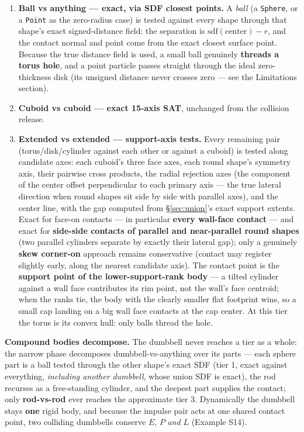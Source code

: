 \documentclass[11pt]{article}
\newcommand{\code}[1]{\texttt{#1}}
\begin{document}
\begin{enumerate}
\item \textbf{Ball vs anything --- exact, via SDF closest points.} A
      \emph{ball} (a \code{Sphere}, or a \code{Point} as the
      zero-radius case) is tested against every shape through that
      shape's exact signed-distance field: the separation is
      $\mathrm{sdf}(\text{center}) - r$, and the contact normal and
      point come from the exact closest surface point. Because the
      true distance field is used, a small ball genuinely
      \textbf{threads a torus hole}, and a point particle passes
      straight through the ideal zero-thickness disk (its unsigned
      distance never crosses zero --- see the Limitations section).
\item \textbf{Cuboid vs cuboid --- exact 15-axis SAT}, unchanged from
      the collision release.
\item \textbf{Extended vs extended --- support-axis tests.} Every
      remaining pair (torus/disk/cylinder against each other or
      against a cuboid) is tested along candidate axes: each cuboid's
      three face axes, each round shape's symmetry axis, their
      pairwise cross products, the radial rejection axes (the
      component of the center offset perpendicular to each primary
      axis --- the true lateral direction when round shapes sit side
      by side with parallel axes), and the center line, with the gap
      computed from \S\ref{sec:union}'s exact support extents. Exact
      for face-on contacts --- in particular \textbf{every wall-face
      contact} --- and exact for \textbf{side-side contacts of
      parallel and near-parallel round shapes} (two parallel cylinders
      separate by exactly their lateral gap); only a genuinely
      \textbf{skew corner-on} approach remains conservative (contact
      may register slightly early, along the nearest candidate axis).
      The contact point is the \textbf{support point of the
      lower-support-rank body} --- a tilted cylinder against a wall
      face contributes its rim point, not the wall's face centroid;
      when the ranks tie, the body with the clearly smaller flat
      footprint wins, so a small cap landing on a big wall face
      contacts at the cap center. At this tier the torus is its convex
      hull: only balls thread the hole.
\end{enumerate}

\textbf{Compound bodies decompose.} The dumbbell never reaches a tier
as a whole: the narrow phase decomposes dumbbell-vs-anything over its
parts --- each sphere part is a ball tested through the other shape's
exact SDF (tier 1, exact against everything, \emph{including another
dumbbell}, whose union SDF is exact), the rod recurses as a
free-standing cylinder, and the deepest part supplies the contact; only
\textbf{rod-vs-rod} ever reaches the approximate tier 3. Dynamically
the dumbbell stays \textbf{one} rigid body, and because the impulse
pair acts at one shared contact point, two colliding dumbbells conserve
$E$, $P$ \emph{and} $L$ (Example S14).
\end{document}
